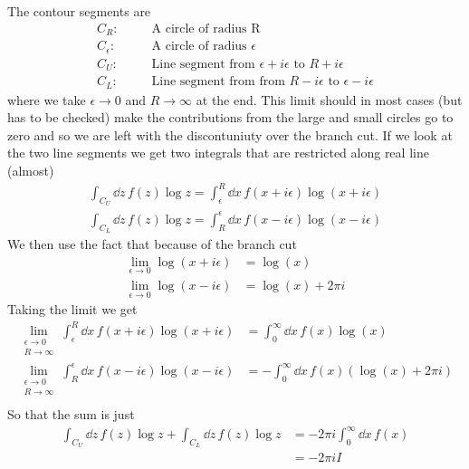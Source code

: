 \documentclass[a4paper,12pt]{article}
\begin{document}
The contour segments are
\begin{equation}
\begin{aligned}
C_R:&~~~~~~~~\text{A circle of radius R}\\
C_\epsilon:&~~~~~~~~\text{A circle of radius }\epsilon\\
C_U:&~~~~~~~~\text{Line segment from $\epsilon+i\epsilon$ to $R+i\epsilon$}\\
C_L:&~~~~~~~~\text{Line segment from from $R-i\epsilon$ to $\epsilon-i\epsilon$}
\end{aligned}
\end{equation}
where we take $\epsilon\to 0$ and $R\to \infty$ at the end. This limit should in most cases (but has to be checked) make the contributions from the large and small circles go to zero and so we are left with the discontuniuty over the branch cut. If we look at the two line segments we get two integrals that are restricted along real line (almost)
\begin{equation}
\begin{aligned}
\int_{C_U}\dd z\, f(z)\log z=\int_{\epsilon}^{R} \dd x\, f(x+i \epsilon)\log (x+i\epsilon)\\
\int_{C_L}\dd z\, f(z)\log z=\int_{R}^{\epsilon} \dd x\, f(x-i \epsilon)\log (x-i\epsilon)
\end{aligned}
\end{equation} 
We then use the fact that because of the branch cut
\begin{equation}
\begin{aligned}
\lim_{\epsilon\to 0}\log(x+i\epsilon)&=\log(x)\\
\lim_{\epsilon\to 0}\log(x-i\epsilon)&=\log(x)+2\pi i
\end{aligned}
\end{equation}
Taking the limit we get
\begin{equation}
	\begin{aligned}
		\lim_{\substack{\epsilon\to0\\R\to\infty}}\int_{\epsilon}^{R} \dd x\, f(x+i \epsilon)\log (x+i\epsilon)&=\int^{\infty}_{0} \dd x\, f(x)\log (x)\\
		\lim_{\substack{\epsilon\to0\\R\to\infty}}\int_{R}^{\epsilon} \dd x\, f(x-i \epsilon)\log (x-i\epsilon)&=-\int^{\infty}_{0} \dd x\, f(x)\left(\log (x)+2\pi i\right)\\
	\end{aligned}
\end{equation} 
So that the sum is just
\begin{equation}
\begin{aligned}
\int_{C_U}\dd z\, f(z)\log z+
\int_{C_L}\dd z\, f(z)\log z
&=-2\pi i\int^{\infty}_{0} \dd x\, f(x)\\
&=-2\pi i I
\end{aligned}
\end{equation}
\end{document}
